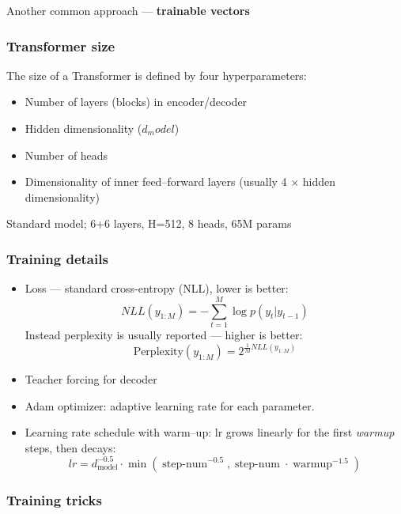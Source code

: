 \documentclass[10pt]{article}
\begin{document}
Another common approach --- \textbf{trainable vectors}

\subsubsection{Transformer size}
The size of a Transformer is defined by four hyperparameters:

\begin{itemize}
    \item Number of layers (blocks) in encoder/decoder
    \item Hidden dimensionality ($d_model$)
    \item Number of heads
    \item Dimensionality of inner feed--forward layers (usually 4 $\times$ hidden dimensionality)
\end{itemize}

Standard model; 6+6 layers, H=512, 8 heads, 65M params


\subsubsection{Training details}

\begin{itemize}
    \item Loss --- standard cross-entropy (NLL), lower is better:
    \begin{equation*}
        NLL(y_{1:M}) = -\sum\limits_{t=1}^{M} \log p(y_{t} | y_{t-1})
    \end{equation*}
    Instead perplexity is usually reported --- higher is better:
    \begin{equation*}
        \text{Perplexity}(y_{1:M}) = 2^{\frac{1}{M} NLL(y_{1:M})}
    \end{equation*}
    \item Teacher forcing for decoder
    \item Adam optimizer: adaptive learning rate for each parameter.
    \item Learning rate schedule with warm--up: lr grows linearly for the first \textit{warmup} steps, then decays:
    \begin{equation*}
        lr=d_{\operatorname{model}}^{-0.5} \cdot \min (\operatorname{step-num}^{-0.5}, \operatorname{step-num} \cdot \operatorname{warmup}^{-1.5})
    \end{equation*}
\end{itemize}

\subsubsection{Training tricks}
\end{document}

